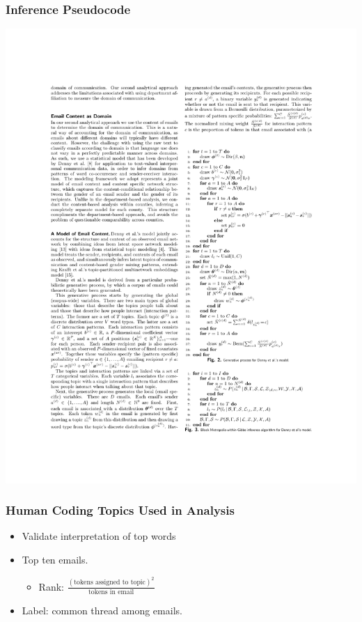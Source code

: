 \documentclass[xcolor={table}, fleqn]{beamer}
\newenvironment{changemargin}[2]{%
  \begin{list}{}{%
    \setlength{\topsep}{0pt}%
    \setlength{\leftmargin}{#1}%
    \setlength{\rightmargin}{#2}%
    \setlength{\listparindent}{\parindent}%
    \setlength{\itemindent}{\parindent}%
    \setlength{\parsep}{\parskip}%
  }%
  \item[]}{\end{list}}
\begin{document}
\begin{frame}\frametitle{Inference Pseudocode}
	\begin{changemargin}{-1cm}{ -1cm}
    \centering
	\includegraphics[width=.88\textwidth]{images/Pseudocode3.pdf}
	\end{changemargin} 
\end{frame}


\begin{frame}\frametitle{Human Coding Topics Used in Analysis}
	\LARGE
	\begin{itemize}
		\item Validate interpretation of top words
		\vspace*{.4in}
		\item Top ten emails.
		\vspace*{.2in}
		\begin{itemize}
			\LARGE
			\item Rank: $\frac{(\text{tokens assigned to topic})^2}{\text{tokens in email}}$
		\end{itemize}
		\vspace*{.2in}
		\item Label: common thread among emails.
	\end{itemize}
\end{frame}
\end{document}
